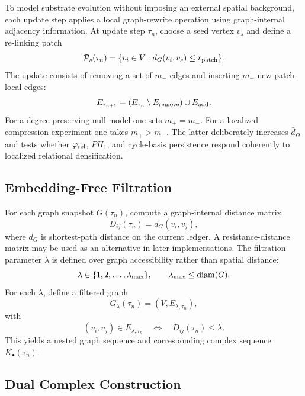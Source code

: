 \documentclass[11pt]{article}
\begin{document}
To model substrate evolution without imposing an external spatial background, each update step applies a local graph-rewrite operation using graph-internal adjacency information. At update step \(\tau_n\), choose a seed vertex \(v_s\) and define a re-linking patch
\begin{equation}
    \mathcal P_s(\tau_n)=\{v_i\in V:d_G(v_i,v_s)\le r_{\rm patch}\}.
\end{equation}
The update consists of removing a set of \(m_-\) edges and inserting \(m_+\) new patch-local edges:
\begin{equation}
    E_{\tau_{n+1}}=\left(E_{\tau_n}\setminus E_{\rm remove}\right)\cup E_{\rm add}.
\end{equation}
For a degree-preserving null model one sets \(m_+=m_-\). For a localized compression experiment one takes \(m_+>m_-\). The latter deliberately increases \(\bar d_\Omega\) and tests whether \(\varphi_{\rm rel}\), \(PH_1\), and cycle-basis persistence respond coherently to localized relational densification.

\subsection{Embedding-Free Filtration}

For each graph snapshot \(G(\tau_n)\), compute a graph-internal distance matrix
\begin{equation}
    D_{ij}(\tau_n)=d_G(v_i,v_j),
\end{equation}
where \(d_G\) is shortest-path distance on the current ledger. A resistance-distance matrix may be used as an alternative in later implementations. The filtration parameter \(\lambda\) is defined over graph accessibility rather than spatial distance:
\begin{equation}
    \lambda\in\{1,2,\ldots,\lambda_{\max}\},
    \qquad
    \lambda_{\max}\le {\rm diam}(G).
\end{equation}
For each \(\lambda\), define a filtered graph
\begin{equation}
    G_\lambda(\tau_n)=(V,E_{\lambda,\tau_n}),
\end{equation}
with
\begin{equation}
    (v_i,v_j)\in E_{\lambda,\tau_n}
    \quad\Longleftrightarrow\quad
    D_{ij}(\tau_n)\le \lambda.
\end{equation}
This yields a nested graph sequence and corresponding complex sequence \(K_\bullet(\tau_n)\).

\subsection{Dual Complex Construction}
\end{document}
